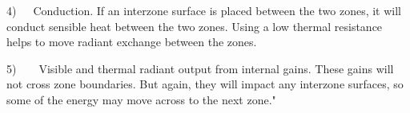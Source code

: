 4)~~~Conduction. If an interzone surface is placed between the two zones, it will conduct sensible heat between the two zones. Using a low thermal resistance helps to move radiant exchange between the zones.

5)~~~~Visible and thermal radiant output from internal gains. These gains will not cross zone boundaries. But again, they will impact any interzone surfaces, so some of the energy may move across to the next zone."
